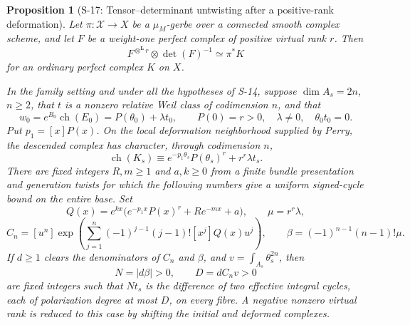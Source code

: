\documentclass[11pt,a4paper]{article}
\newtheorem{proposition}[theorem]{Proposition}
\theoremstyle{definition}
\begin{document}
\begin{proposition}[S-17: Tensor--determinant untwisting after a positive-rank deformation]
\label{prop:semireg-tensor-determinant}
Let $\pi:\mathcal X\to X$ be a $\mu_M$-gerbe over a connected
smooth complex scheme, and let $F$ be a weight-one perfect complex
of positive virtual rank $r$. Then
\[
 F^{\otimes^{\mathbf L}r}\otimes\det(F)^{-1}
 \simeq\pi^*K
\]
for an ordinary perfect complex $K$ on $X$.

In the family setting and under all the hypotheses of S-14,
suppose $\dim A_s=2n$, $n\ge2$, that $t$ is a nonzero relative
Weil class of codimension $n$, and that
\[
 w_0=e^{B_0}\operatorname{ch}(E_0)
     =P(\theta_0)+\lambda t_0,
 \qquad P(0)=r>0,\quad\lambda\ne0,\quad\theta_0t_0=0.
\]
Put $p_1=[x]P(x)$. On the local deformation neighborhood supplied
by Perry, the descended complex has character, through
codimension $n$,
\[
 \operatorname{ch}(K_s)
 \equiv e^{-p_1\theta_s}P(\theta_s)^r+r^r\lambda t_s.
 \tag{S17.1}
\]
There are fixed integers $R,m\ge1$ and $a,k\ge0$ from a finite
bundle presentation and generation twists for which the following
numbers give a uniform signed-cycle bound on the entire base.
Set
\[
 Q(x)=e^{kx}\bigl(e^{-p_1x}P(x)^r+R e^{-mx}+a\bigr),
 \qquad\mu=r^r\lambda,
\]
\[
 C_n=[u^n]\exp\!\left(\sum_{j=1}^n
     (-1)^{j-1}(j-1)![x^j]Q(x)u^j\right),
 \qquad\beta=(-1)^{n-1}(n-1)!\mu .
\]
If $d\ge1$ clears the denominators of $C_n$ and $\beta$, and
$v=\int_{A_s}\theta_s^{2n}$, then
\[
 N=|d\beta|>0,\qquad D=dC_nv>0
 \tag{S17.2}
\]
are fixed integers such that $Nt_s$ is the difference of two
effective integral cycles, each of polarization degree at most
$D$, on every fibre. A negative nonzero virtual rank is reduced
to this case by shifting the initial and deformed complexes.
\end{proposition}
\end{document}
